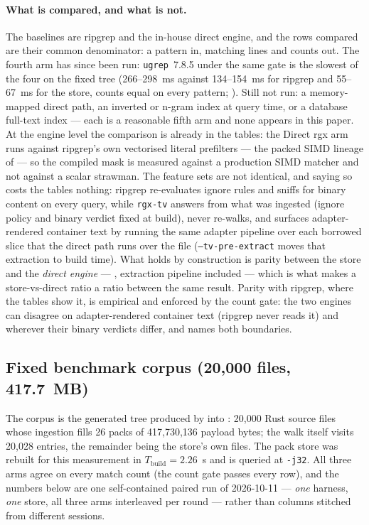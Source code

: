 \documentclass[11pt,letterpaper]{article}
\begin{document}
\paragraph{What is compared, and what is not.}
The baselines are ripgrep and the in-house direct engine, and the rows
compared are their common denominator: a pattern in, matching lines and
counts out. The fourth arm has since been run: \texttt{ugrep}~7.8.5
\cite{ugrep} under the same gate is the slowest of the four on the fixed
tree (266--298~ms against 134--154~ms for ripgrep and 55--67~ms for the
store, counts equal on every pattern; ).
Still not run: a memory-mapped direct path, an
inverted or n-gram index at query time, or a database full-text index ---
each is a reasonable fifth arm and none appears in this paper. At the
engine level the comparison is already in the tables: the Direct rgx arm
runs against ripgrep's own vectorised literal prefilters --- the packed
SIMD lineage of \cite{qiu2021teddy} --- so the compiled mask is measured
against a production SIMD matcher and not against a scalar strawman. The
feature sets are not identical, and saying so costs the tables nothing:
ripgrep re-evaluates ignore rules and sniffs for binary content on every
query, while \texttt{rgx-tv} answers from what was ingested (ignore policy
and binary verdict fixed at build), never re-walks, and surfaces
adapter-rendered container text by running the same adapter pipeline over
each borrowed slice that the direct path runs over the file
(\texttt{--tv-pre-extract} moves that extraction to build time). What holds
by construction is parity between the store and the \emph{direct engine} ---
, extraction pipeline included --- which is what makes
a store-vs-direct ratio a ratio between the same result. Parity with
ripgrep, where the tables show it, is empirical and enforced by the count
gate: the two engines can disagree on adapter-rendered container text
(ripgrep never reads it) and wherever their binary verdicts differ, and
 names both boundaries.

\subsection{Fixed benchmark corpus (20{,}000 files, 417.7~MB)}
\label{sec:eval:tree}
The corpus is the generated tree produced by
 into : 20{,}000
Rust source files whose ingestion fills 26 packs of 417{,}730{,}136 payload
bytes; the walk itself visits 20{,}028 entries, the remainder being the
store's own files. The pack store was rebuilt for this measurement in
$T_{\text{build}} = 2.26$~s and is queried at \texttt{-j32}. All three
arms agree on every match count (the count gate passes every row), and
the numbers below are one self-contained paired run of 2026-10-11 ---
\emph{one} harness, \emph{one} store, all three arms interleaved per round
--- rather than columns stitched from different sessions.
\end{document}
